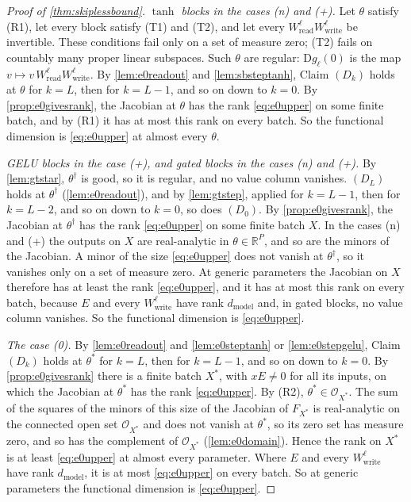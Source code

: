 \documentclass[10pt]{article}
\theoremstyle{definition}
\theoremstyle{remark}
\newcommand{\R}{\mathbb{R}}
\newcommand{\Wread}{W_{\mathrm{read}}}
\newcommand{\Wwrite}{W_{\mathrm{write}}}
\newcommand{\dm}{d_{\mathrm{model}}}
\newcommand{\Der}{\mathrm{D}}
\begin{document}
\begin{proof}[Proof of \cref{thm:skiplessbound}]
\emph{$\tanh$ blocks in the cases (n) and (+).} Let $\theta$ satisfy (R1), let every block satisfy (T1) and (T2), and let every $\Wread^{\ell}\Wwrite^{\ell}$ be invertible. These conditions fail only on a set of measure zero; (T2) fails on countably many proper linear subspaces. Such $\theta$ are regular: $\Der g_\ell(0)$ is the map $v \mapsto v\,\Wread^{\ell}\Wwrite^{\ell}$. By \cref{lem:e0readout} and \cref{lem:sbsteptanh}, Claim $(D_k)$ holds at $\theta$ for $k = L$, then for $k = L-1$, and so on down to $k = 0$. By \cref{prop:e0givesrank}, the Jacobian at $\theta$ has the rank \eqref{eq:e0upper} on some finite batch, and by (R1) it has at most this rank on every batch. So the functional dimension is \eqref{eq:e0upper} at almost every $\theta$.

\emph{GELU blocks in the case (+), and gated blocks in the cases (n) and (+).} By \cref{lem:gtstar}, $\theta^\dagger$ is good, so it is regular, and no value column vanishes. $(D_L)$ holds at $\theta^\dagger$ (\cref{lem:e0readout}), and by \cref{lem:gtstep}, applied for $k = L-1$, then for $k = L-2$, and so on down to $k = 0$, so does $(D_0)$. By \cref{prop:e0givesrank}, the Jacobian at $\theta^\dagger$ has the rank \eqref{eq:e0upper} on some finite batch $X$. In the cases (n) and (+) the outputs on $X$ are real-analytic in $\theta \in \R^P$, and so are the minors of the Jacobian. A minor of the size \eqref{eq:e0upper} does not vanish at $\theta^\dagger$, so it vanishes only on a set of measure zero. At generic parameters the Jacobian on $X$ therefore has at least the rank \eqref{eq:e0upper}, and it has at most this rank on every batch, because $E$ and every $\Wwrite^{\ell}$ have rank $\dm$ and, in gated blocks, no value column vanishes. So the functional dimension is \eqref{eq:e0upper}.

\emph{The case (0).} By \cref{lem:e0readout} and \cref{lem:e0steptanh} or \cref{lem:e0stepgelu}, Claim $(D_k)$ holds at $\theta^*$ for $k = L$, then for $k = L-1$, and so on down to $k = 0$. By \cref{prop:e0givesrank} there is a finite batch $X^*$, with $xE \neq 0$ for all its inputs, on which the Jacobian at $\theta^*$ has the rank \eqref{eq:e0upper}. By (R2), $\theta^* \in \mathcal O_{X^*}$. The sum of the squares of the minors of this size of the Jacobian of $F_{X^*}$ is real-analytic on the connected open set $\mathcal O_{X^*}$ and does not vanish at $\theta^*$, so its zero set has measure zero, and so has the complement of $\mathcal O_{X^*}$ (\cref{lem:e0domain}). Hence the rank on $X^*$ is at least \eqref{eq:e0upper} at almost every parameter. Where $E$ and every $\Wwrite^{\ell}$ have rank $\dm$, it is at most \eqref{eq:e0upper} on every batch. So at generic parameters the functional dimension is \eqref{eq:e0upper}.
\end{proof}
\end{document}
